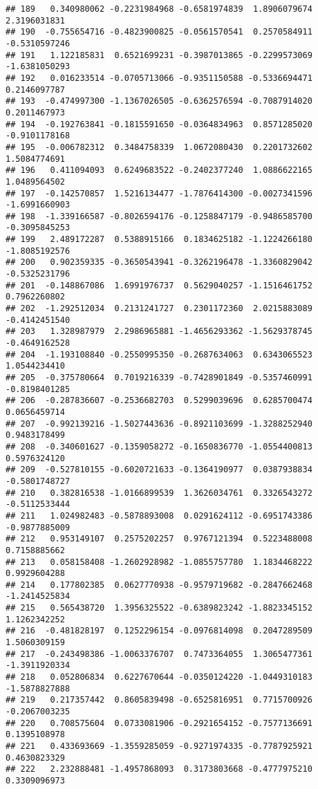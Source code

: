 \documentclass[
]{article}
\begin{document}
\begin{verbatim}
## 189   0.340980062 -0.2231984968 -0.6581974839  1.8906079674  2.3196031831
## 190  -0.755654716 -0.4823900825 -0.0561570541  0.2570584911 -0.5310597246
## 191   1.122185831  0.6521699231 -0.3987013865 -0.2299573069 -1.6381050293
## 192   0.016233514 -0.0705713066 -0.9351150588 -0.5336694471  0.2146097787
## 193  -0.474997300 -1.1367026505 -0.6362576594 -0.7087914020  0.2011467973
## 194  -0.192763841 -0.1815591650 -0.0364834963  0.8571285020 -0.9101178168
## 195  -0.006782312  0.3484758339  1.0672080430  0.2201732602  1.5084774691
## 196   0.411094093  0.6249683522 -0.2402377240  1.0886622165  1.0489564502
## 197  -0.142570857  1.5216134477 -1.7876414300 -0.0027341596 -1.6991660903
## 198  -1.339166587 -0.8026594176 -0.1258847179 -0.9486585700 -0.3095845253
## 199   2.489172287  0.5388915166  0.1834625182 -1.1224266180 -1.8085192576
## 200   0.902359335 -0.3650543941 -0.3262196478 -1.3360829042 -0.5325231796
## 201  -0.148867086  1.6991976737  0.5629040257 -1.1516461752  0.7962260802
## 202  -1.292512034  0.2131241727  0.2301172360  2.0215883089 -0.4142451540
## 203   1.328987979  2.2986965881 -1.4656293362 -1.5629378745 -0.4649162528
## 204  -1.193108840 -0.2550995350 -0.2687634063  0.6343065523  1.0544234410
## 205  -0.375780664  0.7019216339 -0.7428901849 -0.5357460991 -0.8198401285
## 206  -0.287836607 -0.2536682703  0.5299039696  0.6285700474  0.0656459714
## 207  -0.992139216 -1.5027443636 -0.8921103699 -1.3288252940  0.9483178499
## 208  -0.340601627 -0.1359058272 -0.1650836770 -1.0554400813  0.5976324120
## 209  -0.527810155 -0.6020721633 -0.1364190977  0.0387938834 -0.5801748727
## 210   0.382816538 -1.0166899539  1.3626034761  0.3326543272 -0.5112533444
## 211   1.024982483 -0.5878893008  0.0291624112 -0.6951743386 -0.9877885009
## 212   0.953149107  0.2575202257  0.9767121394  0.5223488008  0.7158885662
## 213   0.058158408 -1.2602928982 -1.0855757780  1.1834468222  0.9929604288
## 214   0.177802385  0.0627770938 -0.9579719682 -0.2847662468 -1.2414525834
## 215   0.565438720  1.3956325522 -0.6389823242 -1.8823345152  1.1262342252
## 216  -0.481828197  0.1252296154 -0.0976814098  0.2047289509  1.5060309159
## 217  -0.243498386 -1.0063376707  0.7473364055  1.3065477361 -1.3911920334
## 218   0.052806834  0.6227670644 -0.0350124220 -1.0449310183 -1.5878827888
## 219   0.217357442  0.8605839498 -0.6525816951  0.7715700926 -0.2067003235
## 220   0.708575604  0.0733081906 -0.2921654152 -0.7577136691  0.1395108978
## 221   0.433693669 -1.3559285059 -0.9271974335 -0.7787925921  0.4630823329
## 222   2.232888481 -1.4957868093  0.3173803668 -0.4777975210  0.3309096973

\end{verbatim}
\end{document}

